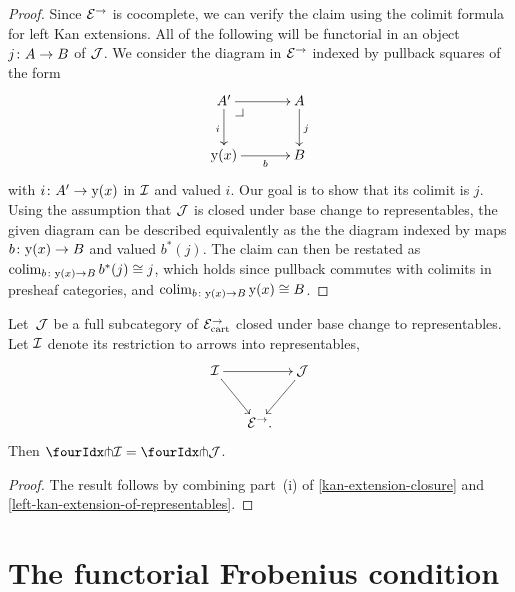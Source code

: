 \documentclass[reqno,10pt,a4paper,oneside,draft]{amsart}
\begin{document}
{{\begin{proof}
Since $\catE^\to$ is cocomplete, we can verify the claim using the colimit formula for left Kan extensions.
All of the following will be functorial in an object $j \co A \to B$ of $\cal{J}$.
We consider the diagram in $\catE^\to$ indexed by pullback squares of the form
\[
\xymatrix@C=1.2cm{
  A'
  \ar[r]
  \ar[d]_{i}
  \pullback{dr}
&
  A
  \ar[d]^{j}
\\
  \yon(x)
  \ar[r]_-{b}
&
  B
}
\]
with $i \co A' \to \yon(x)$ in $\cal{I}$ and valued $i$.
Our goal is to show that its colimit is $j$.
Using the assumption that $\cal{J}$ is closed under base change to representables, the given diagram can be described equivalently as the the diagram indexed by maps $b \co \yon(x) \to B$ and valued $b^*(j)$.
The claim can then be restated as $\colim_{b \co \yon(x) \to B} b^*(j) \iso j$, which holds since pullback commutes with colimits in presheaf categories, and $\colim_{b \co \yon(x) \to B} \yon(x) \iso B$.
\end{proof}

\begin{proposition} \label{awfs-on-arrows-into-representables}
Let~$\cal{J}$ be a full subcategory of $\catE_{\cart}^\to$ closed under base change to representables.
Let $\cal{I}$ denote its restriction to arrows into representables,
\[
\xymatrix@C-1em{
  \cal{I}
  \ar[rr]
  \ar[dr]
&&
  \cal{J}
  \ar[dl]
\\&
  \catE^\to
\rlap{.}}
\]
Then $\liftr{\cal{I}} = \liftr{\cal{J}}$.
\end{proposition}

\begin{proof}
The result follows by combining part~(i) of \cref{kan-extension-closure} and \cref{left-kan-extension-of-representables}.
\end{proof}





\section{The functorial Frobenius condition}
\label{sec:frobc}


}}
\end{document}
